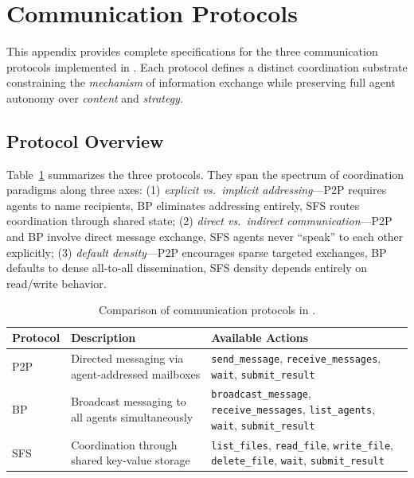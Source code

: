 
\section{Communication Protocols}
\label{app:protocols}

This appendix provides complete specifications for the three communication protocols implemented in \silobench{}. Each protocol defines a distinct coordination substrate constraining the \textit{mechanism} of information exchange while preserving full agent autonomy over \textit{content} and \textit{strategy}.

\subsection{Protocol Overview}

Table~\ref{tab:protocol_comparison} summarizes the three protocols. They span the spectrum of coordination paradigms along three axes: (1) \textit{explicit vs.\ implicit addressing}---P2P requires agents to name recipients, BP eliminates addressing entirely, SFS routes coordination through shared state; (2) \textit{direct vs.\ indirect communication}---P2P and BP involve direct message exchange, SFS agents never ``speak'' to each other explicitly; (3) \textit{default density}---P2P encourages sparse targeted exchanges, BP defaults to dense all-to-all dissemination, SFS density depends entirely on read/write behavior.

\begin{table}[htbp]
\centering
\small
\renewcommand{\arraystretch}{1.15}
\begin{tabularx}{\textwidth}{@{}l >{\raggedright\arraybackslash}X >{\raggedright\arraybackslash}X@{}}
\toprule
\textbf{Protocol} & \textbf{Description} & \textbf{Available Actions} \\
\midrule
P2P & Directed messaging via agent-addressed mailboxes & \texttt{send\_message}, \texttt{receive\_messages}, \texttt{wait}, \texttt{submit\_result} \\
\addlinespace
BP & Broadcast messaging to all agents simultaneously & \texttt{broadcast\_message}, \texttt{receive\_messages}, \texttt{list\_agents}, \texttt{wait}, \texttt{submit\_result} \\
\addlinespace
SFS & Coordination through shared key-value storage & \texttt{list\_files}, \texttt{read\_file}, \texttt{write\_file}, \texttt{delete\_file}, \texttt{wait}, \texttt{submit\_result} \\
\bottomrule
\end{tabularx}
\caption{Comparison of communication protocols in \silobench{}.}
\label{tab:protocol_comparison}
\end{table}

